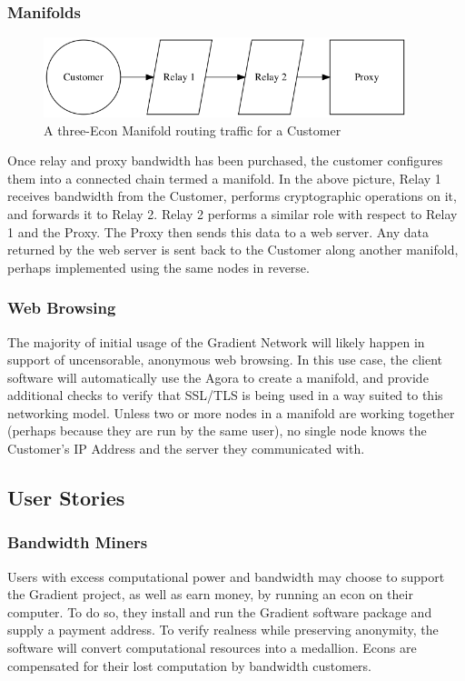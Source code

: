 \documentclass{article}
\begin{document}
\subsubsection{Manifolds}

\begin{figure}[htbp]
  \centering
  \includegraphics[width = 300pt]{sttc}
  \caption{A three-Econ Manifold routing traffic for a Customer}
\end{figure}

Once relay and proxy bandwidth has been purchased, the customer configures them into a connected chain termed a manifold. In the above picture, Relay 1 receives bandwidth from the Customer, performs cryptographic operations on it, and forwards it to Relay 2. Relay 2 performs a similar role with respect to Relay 1 and the Proxy. The Proxy then sends this data to a web server. Any data returned by the web server is sent back to the Customer along another manifold, perhaps implemented using the same nodes in reverse.

\subsubsection{Web Browsing}

The majority of initial usage of the Gradient Network will likely happen in support of uncensorable, anonymous web browsing. In this use case, the client software will automatically use the Agora to create a manifold, and provide additional checks to verify that SSL/TLS is being used in a way suited to this networking model. Unless two or more nodes in a manifold are working together (perhaps because they are run by the same user), no single node knows the Customer's IP Address and the server they communicated with.

\subsection{User Stories}

\subsubsection{Bandwidth Miners}

Users with excess computational power and bandwidth may choose to support the Gradient project, as well as earn money, by running an econ on their computer. To do so, they install and run the Gradient software package and supply a payment address. To verify realness while preserving anonymity, the software will convert computational resources into a medallion. Econs are compensated for their lost computation by bandwidth customers.
\end{document}
